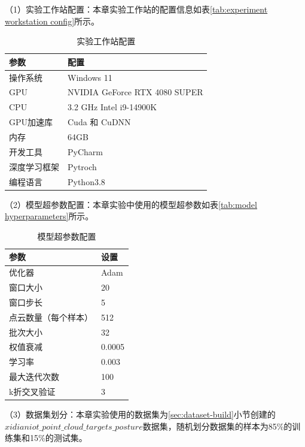 （1）实验工作站配置：本章实验工作站的配置信息如表\eqref{tab:experiment workstation config}所示。
\begin{table}[htbp]
    \centering
    \caption{实验工作站配置}
    \begin{tabular}{ll}
        \toprule
        \textbf{参数} & \textbf{配置} \\
        \midrule
        操作系统 & Windows 11 \\
        GPU & NVIDIA GeForce RTX 4080 SUPER \\
        CPU & 3.2 GHz Intel i9-14900K \\
        GPU加速库 & Cuda 和 CuDNN \\
        内存 & 64GB \\
        开发工具 & PyCharm \\
        深度学习框架 & Pytroch \\
        编程语言 & Python3.8 \\
        \bottomrule
    \end{tabular}
    \label{tab:experiment workstation config}
\end{table}

（2）模型超参数配置：本章实验中使用的模型超参数如表\eqref{tab:model hyperparameters}所示。
\begin{table}[htbp]
    \centering
    \caption{模型超参数配置}
    \begin{tabular}{ll}
        \toprule
        \textbf{参数} & \textbf{设置} \\
        \midrule
        优化器 & Adam \\
        窗口大小 & 20 \\
        窗口步长 & 5 \\
        点云数量（每个样本） & 512 \\
        批次大小 & 32 \\
        权值衰减 & 0.0005 \\
        学习率 & 0.003 \\
        最大迭代次数 & 100 \\
        k折交叉验证 & 3 \\
        \bottomrule
    \end{tabular}
    \label{tab:model hyperparameters}
\end{table}

（3）数据集划分：本章实验使用的数据集为\eqref{sec:dataset-build}小节创建的$xidianiot\_point\_cloud\_targets\_posture$数据集，随机划分数据集的样本为85\%的训练集和15\%的测试集。


